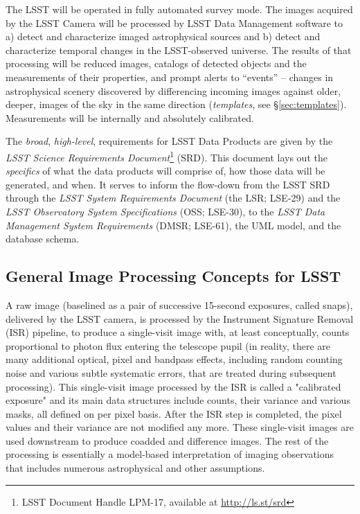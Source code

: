 \documentclass[12pt]{article}
\begin{document}
The LSST will be operated in fully automated survey mode. The images acquired by the LSST Camera will be processed by LSST Data Management software to a) detect and characterize imaged astrophysical sources and b) detect and characterize temporal changes in the LSST-observed universe. The results of that processing will be reduced images, catalogs of detected objects and the measurements of their properties, and prompt alerts to ``events'' -- changes in astrophysical scenery discovered by differencing incoming images against older, deeper, images of the sky in the same direction ({\em templates}, see \S \ref{sec:templates}). Measurements will be internally and absolutely calibrated.

\vspace{1em}

The {\em broad}, {\em high-level}, requirements for LSST Data Products are given by the {\em LSST Science Requirements Document}\footnote{LSST Document Handle LPM-17, available at \url{http://ls.st/srd}} (SRD). This document lays out the {\em specifics} of what the data products will comprise of, how those data will be generated, and when. It serves to inform the flow-down from the LSST SRD through the {\em LSST System Requirements Document} (the LSR; LSE-29) and the {\em LSST Observatory System Specifications} (OSS; LSE-30), to the {\em LSST Data Management System Requirements} (DMSR; LSE-61), the UML model, and the database schema.


\subsection{General Image Processing Concepts for LSST}

 A raw image (baselined as a pair of successive 15-second exposures, called snaps),
delivered by the LSST camera, is processed by the Instrument Signature
Removal (ISR) pipeline, to produce a single-visit image with, at least
conceptually, counts proportional to photon flux entering the
telescope pupil (in reality, there are many additional optical, pixel and
bandpass effects, including random counting noise and various subtle
systematic errors, that are treated during subsequent processing).
This single-visit image processed by the ISR is called a "calibrated
exposure" and its main data structures include counts, their variance and
various masks, all defined on per pixel basis. After the ISR step is
completed, the pixel values and their variance are not modified any more.
These single-visit images are used downstream to produce coadded and difference
images. The rest of the processing is essentially a model-based interpretation
of imaging observations that includes numerous astrophysical and other
assumptions.
\end{document}
